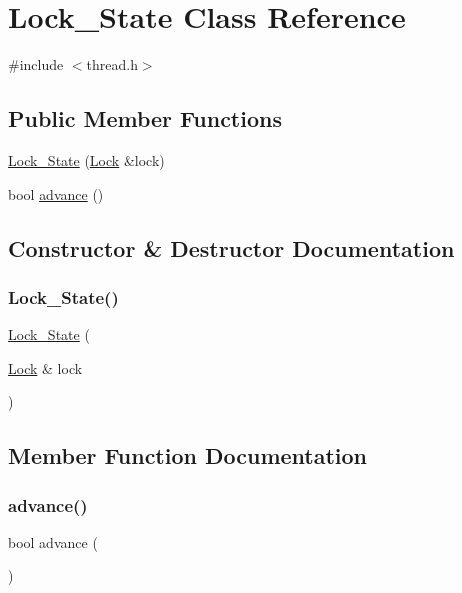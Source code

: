 \hypertarget{classLock__State}{}\section{Lock\+\_\+\+State Class Reference}
\label{classLock__State}


{\ttfamily \#include $<$thread.\+h$>$}

\subsection*{Public Member Functions}
\begin{DoxyCompactItemize}
\item 
\mbox{\hyperlink{classLock__State_a11c7332a9c3409903a8f9d8d44b613b6}{Lock\+\_\+\+State}} (\mbox{\hyperlink{classLock}{Lock}} \&lock)
\item 
bool \mbox{\hyperlink{classLock__State_a26e94ac149e5205057d93cf14dfa3325}{advance}} ()
\end{DoxyCompactItemize}


\subsection{Constructor \& Destructor Documentation}
\mbox{\label{classLock__State_a11c7332a9c3409903a8f9d8d44b613b6}} 
\subsubsection{\texorpdfstring{Lock\+\_\+\+State()}{Lock\_State()}}
{\footnotesize\ttfamily \mbox{\hyperlink{classLock__State}{Lock\+\_\+\+State}} (\begin{DoxyParamCaption}\item[{\mbox{\hyperlink{classLock}{Lock}} \&}]{lock }\end{DoxyParamCaption})\hspace{0.3cm}{\ttfamily [inline]}}



\subsection{Member Function Documentation}
\mbox{\label{classLock__State_a26e94ac149e5205057d93cf14dfa3325}} 
\subsubsection{\texorpdfstring{advance()}{advance()}}
{\footnotesize\ttfamily bool advance (\begin{DoxyParamCaption}{ }\end{DoxyParamCaption})\hspace{0.3cm}{\ttfamily [inline]}}

